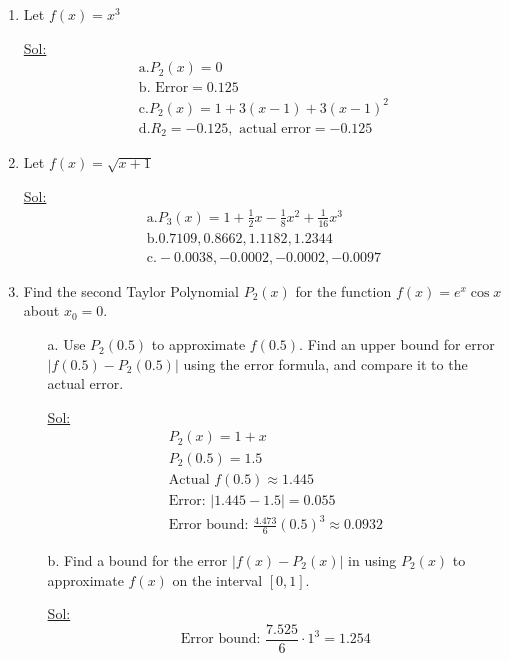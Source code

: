 \begin{enumerate}
\item Let $f(x) = x^3$

  \underline{Sol:}\\

  \[
    \begin{array}{l}
      \text{a.} P_2 (x) = 0\\
      \text{b. Error} = 0.125\\
      \text{c.} P_2 (x) = 1 + 3 (x-1) + 3 (x-1)^2\\
      \text{d.} R_2 = -0.125, \text{ actual error} = -0.125
    \end{array}
  \]
\item Let $f(x) = \sqrt{x + 1}$
    
    \underline{Sol:}\\
    \[
      \begin{array}{l}
        \text{a.} P_3 (x) = 1 + \frac{1}{2}x - \frac{1}{8}x^2 + \frac{1}{16} x^3\\
        \text{b.} 0.7109, 0.8662, 1.1182, 1.2344\\
        \text{c.} -0.0038, -0.0002, -0.0002, -0.0097
      \end{array}
    \]
\item Find the second Taylor Polynomial \( P_2(x) \) for the function
  \( f(x) = e^x \cos x \) about \( x_0 = 0 \).
  \begin{itemize}
    \item[a.] Use \( P_2(0.5) \) to approximate \( f(0.5) \). Find an
      upper bound for error \( |f(0.5) - P_2(0.5)| \) using the error
      formula, and compare it to the actual error.

      \underline{Sol:}\\
      \[
        \begin{array}{l}
          P_2(x) = 1 + x \\
          P_2(0.5) = 1.5 \\
          \textrm{Actual } f(0.5) \approx 1.445 \\
          \textrm{Error: } |1.445 - 1.5| = 0.055 \\
          \textrm{Error bound: } \frac{4.473}{6}(0.5)^3 \approx 0.0932
        \end{array}
      \]
      \bigbreak

    \item[b.] Find a bound for the error \( |f(x) - P_2(x)| \) in
      using \( P_2(x) \) to approximate \( f(x) \) on the interval \([0,1]\).

      \underline{Sol:}\\
      \[
        \textrm{Error bound: } \frac{7.525}{6} \cdot 1^3 = 1.254
      \]
      \bigbreak


\end{itemize}
\end{enumerate}
